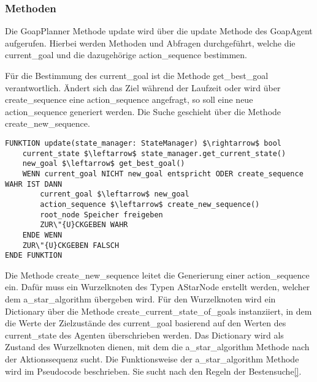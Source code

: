 
\subsubsection{Methoden}
\label{chap:goapplaner methoden}

Die GoapPlanner Methode update wird über die update Methode des GoapAgent aufgerufen. Hierbei werden Methoden und Abfragen durchgeführt, welche die current\_goal und die dazugehörige action\_sequence bestimmen. 

Für die Bestimmung des current\_goal ist die Methode get\_best\_goal verantwortlich. \"{A}ndert sich das Ziel während der Laufzeit oder wird über create\_sequence eine action\_sequence angefragt, so soll eine neue action\_sequence generiert werden. Die Suche geschieht über die Methode create\_new\_sequence. 

\begin{lstlisting}[language=Pseudo, caption={update Methode des GoapAgent}, mathescape=true]
FUNKTION update(state_manager: StateManager) $\rightarrow$ bool
    current_state $\leftarrow$ state_manager.get_current_state()
    new_goal $\leftarrow$ get_best_goal()
    WENN current_goal NICHT new_goal entspricht ODER create_sequence WAHR IST DANN
        current_goal $\leftarrow$ new_goal
        action_sequence $\leftarrow$ create_new_sequence()
        root_node Speicher freigeben
        ZUR\"{U}CKGEBEN WAHR
    ENDE WENN
    ZUR\"{U}CKGEBEN FALSCH
ENDE FUNKTION
\end{lstlisting}

Die Methode create\_new\_sequence leitet die Generierung einer action\_sequence ein. Dafür muss ein Wurzelknoten des Typen AStarNode erstellt werden, welcher dem a\_star\_algorithm übergeben wird. Für den Wurzelknoten wird ein Dictionary über die Methode create\_current\_state\_of\_goals instanziiert, in dem die Werte der Zielzustände des current\_goal basierend auf den Werten des current\_state des Agenten überschrieben werden. Das Dictionary wird als Zustand des Wurzelknoten dienen, mit dem die a\_star\_algorithm Methode nach der Aktionssequenz sucht. Die Funktionsweise der a\_star\_algorithm Methode wird im Pseudocode beschrieben. Sie sucht nach den Regeln der Bestensuche\ref{}.

